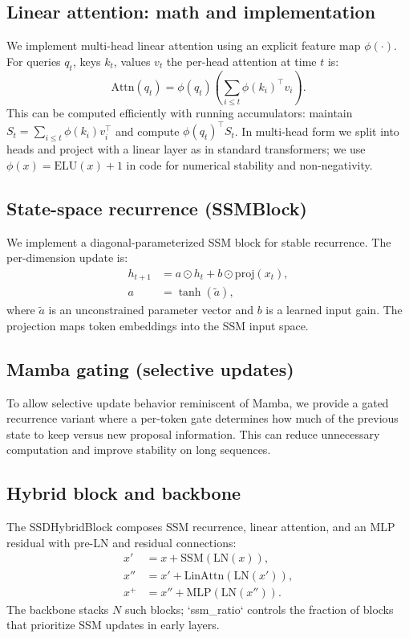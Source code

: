 \documentclass{article}
\begin{document}
\subsection{Linear attention: math and implementation}
We implement multi-head linear attention using an explicit feature map $\phi(\cdot)$. For queries $q_t$, keys $k_t$, values $v_t$ the per-head attention at time $t$ is:
\begin{equation}
\mathrm{Attn}(q_t) = \phi(q_t) \left( \sum_{i\le t} \phi(k_i)^\top v_i \right).
\end{equation}
This can be computed efficiently with running accumulators: maintain $S_t=\sum_{i\le t} \phi(k_i) v_i^\top$ and compute $\phi(q_t)^\top S_t$. In multi-head form we split into heads and project with a linear layer as in standard transformers; we use $\phi(x)=\mathrm{ELU}(x)+1$ in code for numerical stability and non-negativity.

\subsection{State-space recurrence (SSMBlock)}
We implement a diagonal-parameterized SSM block for stable recurrence. The per-dimension update is:
\begin{align}
h_{t+1} &= a \odot h_t + b \odot \mathrm{proj}(x_t),\\
a &= \tanh(\tilde a),
\end{align}
where $\tilde a$ is an unconstrained parameter vector and $b$ is a learned input gain. The projection maps token embeddings into the SSM input space.

\subsection{Mamba gating (selective updates)}
To allow selective update behavior reminiscent of Mamba, we provide a gated recurrence variant where a per-token gate determines how much of the previous state to keep versus new proposal information. This can reduce unnecessary computation and improve stability on long sequences.

\subsection{Hybrid block and backbone}
The SSDHybridBlock composes SSM recurrence, linear attention, and an MLP residual with pre-LN and residual connections:
\begin{align}
x' &= x + \mathrm{SSM}(\mathrm{LN}(x)),\\
x'' &= x' + \mathrm{LinAttn}(\mathrm{LN}(x')),\\
x^{+} &= x'' + \mathrm{MLP}(\mathrm{LN}(x'')).
\end{align}
The backbone stacks $N$ such blocks; `ssm\_ratio` controls the fraction of blocks that prioritize SSM updates in early layers.
\end{document}
